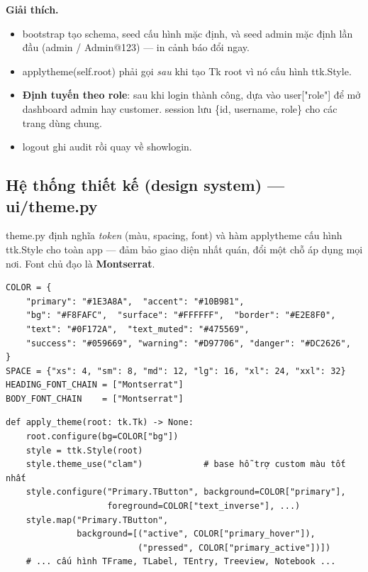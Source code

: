 \documentclass[12pt,a4paper]{article}
\newcommand{\code}[1]{{\ttfamily\small\def\_{\textunderscore\discretionary{}{}{}}#1}}
\begin{document}
\textbf{Giải thích.}
\begin{itemize}
  \item \code{\_bootstrap} tạo schema, seed cấu hình mặc định, và seed admin
        mặc định lần đầu (\code{admin / Admin@123}) — in cảnh báo đổi ngay.
  \item \code{apply\_theme(self.root)} phải gọi \emph{sau} khi tạo Tk root vì nó
        cấu hình \code{ttk.Style}.
  \item \textbf{Định tuyến theo role}: sau khi login thành công, dựa vào
        \code{user["role"]} để mở dashboard admin hay customer. \code{session}
        lưu \code{\{id, username, role\}} cho các trang dùng chung.
  \item \code{logout} ghi audit rồi quay về \code{show\_login}.
\end{itemize}

\subsection{Hệ thống thiết kế (design system) — \code{ui/theme.py}}

\code{theme.py} định nghĩa \emph{token} (màu, spacing, font) và hàm
\code{apply\_theme} cấu hình \code{ttk.Style} cho toàn app — đảm bảo giao diện
nhất quán, đổi một chỗ áp dụng mọi nơi. Font chủ đạo là \textbf{Montserrat}.

\begin{Verbatim}
COLOR = {
    "primary": "#1E3A8A",  "accent": "#10B981",
    "bg": "#F8FAFC",  "surface": "#FFFFFF",  "border": "#E2E8F0",
    "text": "#0F172A",  "text_muted": "#475569",
    "success": "#059669", "warning": "#D97706", "danger": "#DC2626",
}
SPACE = {"xs": 4, "sm": 8, "md": 12, "lg": 16, "xl": 24, "xxl": 32}
HEADING_FONT_CHAIN = ["Montserrat"]
BODY_FONT_CHAIN    = ["Montserrat"]
\end{Verbatim}

\begin{Verbatim}
def apply_theme(root: tk.Tk) -> None:
    root.configure(bg=COLOR["bg"])
    style = ttk.Style(root)
    style.theme_use("clam")            # base hỗ trợ custom màu tốt nhất
    style.configure("Primary.TButton", background=COLOR["primary"],
                    foreground=COLOR["text_inverse"], ...)
    style.map("Primary.TButton",
              background=[("active", COLOR["primary_hover"]),
                          ("pressed", COLOR["primary_active"])])
    # ... cấu hình TFrame, TLabel, TEntry, Treeview, Notebook ...
\end{Verbatim}
\end{document}
